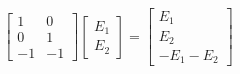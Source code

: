 \documentclass[12pt,preview,border=0]{standalone}
\begin{document}
$$
\begin{bmatrix}
    1 & 0 \\
    0 & 1 \\
    -1 & -1
    \end{bmatrix} 
    \begin{bmatrix}
    E_1 \\
    E_2
    \end{bmatrix} = 
    \begin{bmatrix}
    E_1 \\
    E_2 \\
    -E_1 - E_2
\end{bmatrix}
$$
\end{document}
